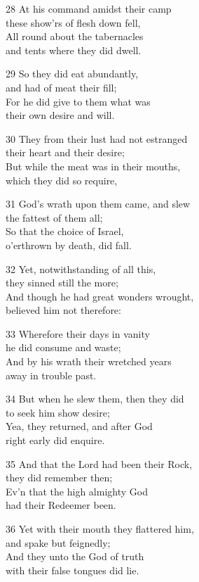 28 At his command amidst their camp\\
these show’rs of flesh down fell,\\
All round about the tabernacles\\
and tents where they did dwell.

29 So they did eat abundantly,\\
and had of meat their fill;\\
For he did give to them what was\\
their own desire and will.

30 They from their lust had not estranged\\
their heart and their desire;\\
But while the meat was in their mouths,\\
which they did so require,

31 God’s wrath upon them came, and slew\\
the fattest of them all;\\
So that the choice of Israel,\\
o’erthrown by death, did fall.

32 Yet, notwithstanding of all this,\\
they sinned still the more;\\
And though he had great wonders wrought,\\
believed him not therefore:

33 Wherefore their days in vanity\\
he did consume and waste;\\
And by his wrath their wretched years\\
away in trouble past.

34 But when he slew them, then they did\\
to seek him show desire;\\
Yea, they returned, and after God\\
right early did enquire.

35 And that the Lord had been their Rock,\\
they did remember then;\\
Ev’n that the high almighty God\\
had their Redeemer been.

36 Yet with their mouth they flattered him,\\
and spake but feignedly;\\
And they unto the God of truth\\
with their false tongues did lie.

